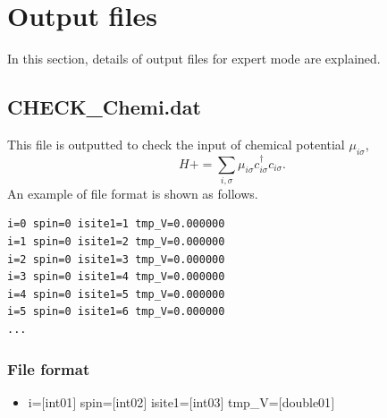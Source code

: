 \newpage
\section{Output files}
\label{Sec:outputfile}
In this section, details of output files for expert mode are explained.
\subsection{CHECK\_Chemi.dat}
\label{Subsec:checkchemi}
This file is outputted to check the input of chemical potential $\mu_{i\sigma}$,
\begin{equation}
H+=\sum_{i,\sigma} \mu_{i\sigma} c_{i\sigma}^{\dagger}c_{i\sigma}.
\end{equation}
An example of file format is shown as follows.

\begin{minipage}{12.5cm}
\begin{screen}
\begin{verbatim}
i=0 spin=0 isite1=1 tmp_V=0.000000 
i=1 spin=0 isite1=2 tmp_V=0.000000 
i=2 spin=0 isite1=3 tmp_V=0.000000 
i=3 spin=0 isite1=4 tmp_V=0.000000 
i=4 spin=0 isite1=5 tmp_V=0.000000 
i=5 spin=0 isite1=6 tmp_V=0.000000 
...
\end{verbatim}
\end{screen}
\end{minipage}

\subsubsection{File format}
 \begin{itemize}
   \item  i=$[$int01$]$ spin=$[$int02$]$ isite1=$[$int03$]$ tmp\_V=$[$double01$]$ 
 \end{itemize}
  
